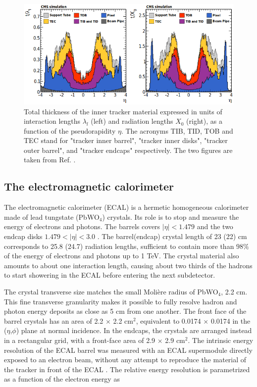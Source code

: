 \begin{figure}
    \centering
    \includegraphics[width=\textwidth]{Images/trackerthickness.png}
    \caption{Total thickness of the inner tracker material expressed in units of interaction lengths $\lambda_{l}$ (left) and radiation lengths $X_{0}$ (right), as a function of the pseudorapidity $\eta$. The acronyms TIB, TID, TOB and TEC stand for "tracker inner barrel", "tracker inner disks", "tracker outer barrel", and "tracker endcaps" respectively. The two figures are taken from Ref. \cite{Collaboration_2014}.}
    \label{fig:tracker_material}
\end{figure}

\subsection{The electromagnetic calorimeter}

The electromagnetic calorimeter (ECAL) \cite{CERN-LHCC-97-033,Bloch:581342} is a hermetic homogeneous calorimeter made of lead tungstate (PbWO$_4$) crystals. Its role is to stop and measure the energy of electrons and photons. The barrels covers $|\eta| < 1.479$ and the two endcap disks $1.479 < |\eta| < 3.0$ . The barrel(endcap) crystal length of 23 (22) cm corresponds to 25.8 (24.7) radiation lengths, sufficient to contain more than $98\%$ of the energy of electrons and photons up to 1 TeV. The crystal material also amounts to about one interaction length, causing about two thirds of the hadrons to start showering in the ECAL before entering the next subdetector.

The crystal transverse size matches the small Molière radius of PbWO$_4$, 2.2 cm. This fine transverse granularity makes it possible to fully resolve hadron and photon energy deposits as close as 5 cm from one another. The front face of the barrel crystals has an area of 2.2 $\times$ 2.2 cm$^2$, equivalent to 0.0174 $\times$ 0.0174 in the ($\eta$,$\phi$) plane at normal incidence. In the endcaps, the crystals are arranged instead in a rectangular grid, with a front-face area of 2.9 $\times$ 2.9 cm$^2$. The intrinsic energy resolution of the ECAL barrel was measured with an ECAL supermodule directly exposed to an electron beam, without any attempt to reproduce the material of the tracker in front of the ECAL \cite{Ingram_2007}. The relative energy resolution is parametrized as a function of the electron energy as 

